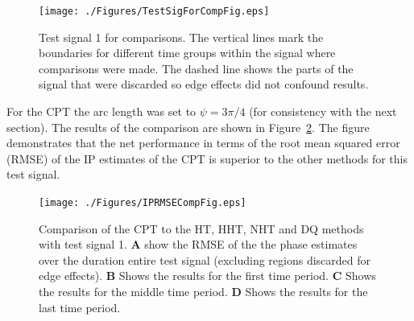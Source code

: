 \documentclass[a4paper]{IEEEtran}
\begin{document}
\begin{figure}[htbp]
	\centering
		\texttt{[image: ./Figures/TestSigForCompFig.eps]}
	\caption{Test signal 1 for comparisons. The vertical lines mark the boundaries for different time groups within the signal where comparisons were made. The dashed line shows the parts of the signal that were discarded so edge effects did not confound results.}
	\label{fig:TestSig1}
\end{figure}

For the CPT the arc length was set to $\psi=3\pi/4$ (for consistency with the next section). The results of the comparison are shown in Figure~\ref{fig:ResultsTestSig1}. The figure demonstrates that the net performance in terms of the root mean squared error (RMSE) of the IP estimates of the CPT is superior to the other methods for this test signal.

\begin{figure}[!h]
	\centering
		\texttt{[image: ./Figures/IPRMSECompFig.eps]}
	\caption{Comparison of the CPT to the HT, HHT, NHT and DQ methods with test signal 1. \textbf{A} show the RMSE of the the phase estimates over the duration entire test signal (excluding regions discarded for edge effects). \textbf{B} Shows the results for the first time period. \textbf{C} Shows the results for the middle time period. \textbf{D} Shows the results for the last time period.}
	\label{fig:ResultsTestSig1}
\end{figure}
\end{document}
